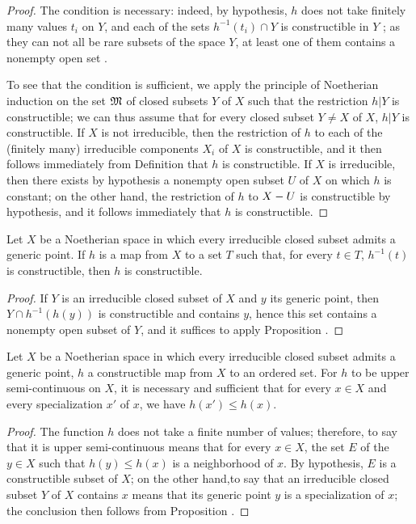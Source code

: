 \begin{proof}
\label{proof-0.9.3.2}
The condition is necessary: indeed, by hypothesis, $h$ does not take finitely many values $t_i$ on $Y$, and each of the sets $h^{-1}(t_i)\cap Y$ is constructible in $Y$ ; as they can not all be rare subsets of the space $Y$, at least one of them contains a nonempty open set .

To see that the condition is sufficient, we apply the principle of Noetherian induction on the set $\mathfrak{M}$ of closed subsets $Y$ of $X$ such that the restriction $h|Y$ is constructible; we can thus assume that for every closed subset $Y\neq X$ of $X$,
$h|Y$ is constructible.
If $X$ is not irreducible, then the restriction of $h$ to each of the (finitely many) irreducible components $X_i$ of $X$ is constructible, and it then follows immediately from Definition  that $h$ is constructible.
If $X$ is irreducible, then there exists by hypothesis a nonempty open subset $U$ of $X$ on which $h$ is constant; on the other hand, the restriction of $h$ to $X- U$ is constructible by hypothesis, and it follows immediately that $h$ is constructible.
\end{proof}

\begin{cor}[9.3.3]
\label{0.9.3.3}
Let $X$ be a Noetherian space in which every irreducible closed subset admits a generic point.
If $h$ is a map from $X$ to a set $T$ such that, for every $t\in T$, $h^{-1}(t)$ is constructible, then $h$ is constructible.
\end{cor}

\begin{proof}
\label{proof-0.9.3.3}
If $Y$ is an irreducible closed subset of $X$ and $y$ its generic point, then $Y\cap h^{-1}(h(y))$ is constructible and contains $y$, hence  this set contains a nonempty open subset of $Y$, and it suffices to apply Proposition .
\end{proof}

\begin{prop}[9.3.4]
\label{0.9.3.4}
Let $X$ be a Noetherian space in which every irreducible closed subset admits a generic point, $h$ a constructible map from $X$ to an ordered set.
For $h$ to be upper semi-continuous on $X$, it is necessary and sufficient that for every $x\in X$ and every specialization  $x'$ of $x$, we have $h(x')\leqslant h(x)$.
\end{prop}

\begin{proof}
\label{proof-0.9.3.4}
The function $h$ does not take a finite number of values; therefore, to say that it is upper semi-continuous means that for every $x\in X$, the set $E$ of the $y\in X$ such that $h(y)\leqslant h(x)$ is a neighborhood of $x$.
By hypothesis, $E$ is a constructible subset of $X$; on the other hand,to say that an irreducible closed subset $Y$ of $X$ contains $x$ means that its generic point $y$ is a specialization of $x$; the conclusion then follows from Proposition .
\end{proof}
